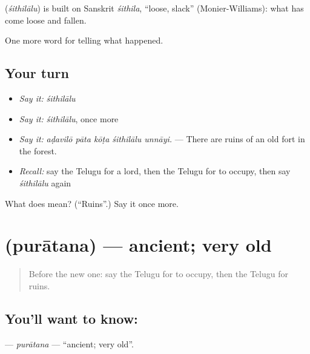 \begin{cousinweb}
\textbf{} (\emph{śithilālu}) is built on Sanskrit \emph{śithila}, \textquotedblleft{}loose, slack\textquotedblright{} (Monier-Williams): what has come loose and fallen.
\end{cousinweb}

\begin{grammarlens}[title={What you've built}]
One more word for telling what happened.
\end{grammarlens}

\subsection*{Your turn}
\begin{itemize}
\raggedright
  \item \emph{Say it:} \emph{śithilālu}
  \item \emph{Say it:} \emph{śithilālu}, once more
  \item \emph{Say it:} \emph{aḍavilō pāta kōṭa śithilālu unnāyi.} — There are ruins of an old fort in the forest.
  \item \emph{Recall:} say the Telugu for a lord, then the Telugu for to occupy, then say \emph{śithilālu} again
\end{itemize}

\begin{tcolorbox}[breakable,colback=teal!4,colframe=teal!35!black,title={Before you move on}]
What does  mean? (\textquotedblleft{}Ruins\textquotedblright{}.) Say it once more.
\end{tcolorbox}
\section[\texorpdfstring{\te{పురాతన} (purātana)}{పురాతన (purātana)}]{ (purātana) — ancient; very old}

\label{lesson:TE-C367-puratana}



\begin{quote}
Before the new one: say the Telugu for to occupy, then the Telugu for ruins.
\end{quote}

\subsection*{You'll want to know: }
\textbf{} — \emph{purātana} — \textquotedblleft{}ancient; very old\textquotedblright{}.

